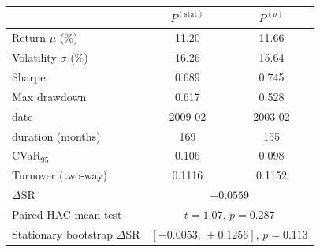 \begin{tabular}{lcc}
\toprule
 & $P^{(\mathrm{stat})}$ & $P^{(\rho)}$ \\
\midrule
Return $\mu$ (\%) & 11.20 & 11.66 \\
Volatility $\sigma$ (\%) & 16.26 & 15.64 \\
Sharpe & 0.689 & 0.745 \\
Max drawdown & 0.617 & 0.528 \\
\quad date & 2009-02 & 2003-02 \\
\quad duration (months) & 169 & 155 \\
CVaR$_{95}$ & 0.106 & 0.098 \\
Turnover (two-way) & 0.1116 & 0.1152 \\
\midrule
$\Delta\mathrm{SR}$ & \multicolumn{2}{c}{$+0.0559$} \\
Paired HAC mean test & \multicolumn{2}{c}{$t=1.07,\,p=0.287$} \\
Stationary bootstrap $\Delta\mathrm{SR}$ & \multicolumn{2}{c}{$[-0.0053,\,+0.1256],\,p=0.113$} \\
\bottomrule
\end{tabular}

